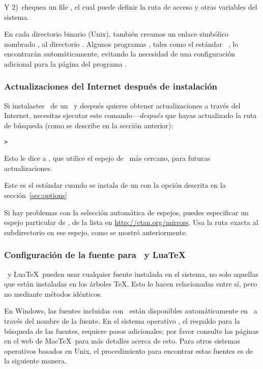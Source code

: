 \documentclass{article}
\begin{document}
Y 2)~chequea un file , el cual puede
definir la ruta de acceso y otras variables del sistema.

En cada directorio binario (Unix), también creamos un enlace simbólico
nombrado , al directorio .
Algunos programas , tales como el estándar \MacOSX\
, lo encontrarán automáticamente, evitando la necesidad de
una configuración adicional para la página del programa
.

\subsubsection{Actualizaciones del Internet después de instalación}
\label{sec:dvd-install-net-updates}

Si instalastes \TL\ de un \DVD\ y después quieres obtener
actualizaciones a través del Internet, necesitas ejecutar este
comando---\emph{después} que hayas actualizado la ruta de
búsqueda (como se describe en la sección anterior):

\begin{alltt}
> 
\end{alltt}

Esto le dice a , que utilice el espejo de \CTAN\ más
cercano, para futuras actualizaciones. 

Este es el estándar cuando se instala de un \DVD con la opción
descrita en la sección~\ref{sec:options}

Si hay problemas con la selección automática de espejos, puedes
especificar un espejo particular de \CTAN, de la lista en
\url{http://ctan.org/mirrors}. Usa la ruta exacta al subdirectorio
\dirname{tlnet} en ese espejo, como se mostró anteriormente.

\subsubsection{Configuración de la fuente para \XeTeX\ y Lua\TeX}
\label{sec:font-conf-sys}

\XeTeX\ y Lua\TeX\ pueden usar cualquier fuente instalada en el
sistema, no solo aquellas que están instaladas en los árboles \TeX.
Esto lo hacen relacionadas entre sí, pero no mediante métodos
idénticos. 

En Windows, las fuentes incluidas con \TL\ están disponibles
automáticamente en \XeTeX\ a través del nombre de la fuente. En el
sistema operativo \MacOSX, el respaldo para la búsqueda de las
fuentes, requiere pasos adicionales; por favor consulte las páginas en el web
de Mac\TeX\ para más detalles acerca de esto. Para otros sistemas
operativos basados en Unix, el procedimiento para encontrar estas
fuentes es de la siguiente manera. 
\end{document}
